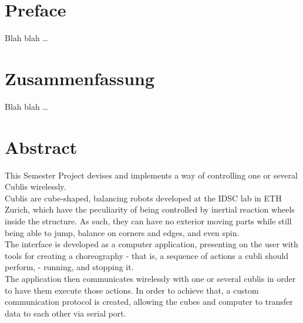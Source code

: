 
\chapter*{Preface}

Blah blah \dots

 \cleardoublepage


 \setcounter{tocdepth}{2}
 \tableofcontents

 \cleardoublepage


\chapter*{Zusammenfassung}

Blah blah \dots


 \cleardoublepage

\chapter*{Abstract}

This Semester Project devises and implements a way of controlling one or several Cublis wirelessly.\\ 

Cublis are cube-shaped, balancing robots developed at the IDSC lab in ETH Zurich, which have the peculiarity of being controlled by inertial reaction wheels inside the structure. As such, they can have no exterior moving parts while still being able to jump, balance on corners and edges, and even spin.\\ 

The interface is developed as a computer application, presenting on the user with tools for creating a choreography - that is, a sequence of actions a cubli should perform, - running, and stopping it.\\ 

The application then communicates wirelessly with one or several cublis in order to have them execute those actions. In order to achieve that, a custom communication protocol is created, allowing the cubes and computer to transfer data to each other via serial port.\\ 


